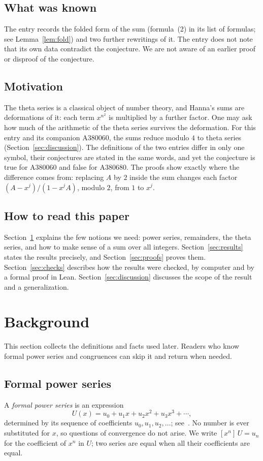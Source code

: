 \documentclass[11pt,a4paper]{article}
\theoremstyle{definition}
\theoremstyle{remark}
\newcommand{\coeff}[2]{[x^{#1}]\,#2}
\begin{document}
\subsection{What was known}
The entry records the folded form of the sum (formula~(2) in its list of formulas; see Lemma~\ref{lem:fold}) and two further
rewritings of it. The entry does not note that its own data contradict the conjecture. We are not aware of an earlier proof or disproof of the conjecture.

\subsection{Motivation}
The theta series is a classical object of number theory, and Hanna's sums are deformations of it: each term
$x^{n^2}$ is multiplied by a further factor. One may ask how much of the arithmetic of the theta series survives the
deformation. For this entry and its companion A380060, the sums reduce modulo $4$ to theta series
(Section~\ref{sec:discussion}).
The definitions of the two entries differ in only one symbol, their
conjectures are stated in the same words, and yet the conjecture is true for A380060 and false for A380680. The proofs show exactly where the
difference comes from: replacing $A$ by $2$ inside the sum changes each factor $(A-x^j)/(1-x^jA)$, modulo $2$, from $1$
to $x^j$.

\subsection{How to read this paper}
Section~\ref{sec:background} explains the few notions we need: power series, remainders, the theta series, and how to
make sense of a sum over all integers. Section~\ref{sec:results} states the results precisely, and
Section~\ref{sec:proofs} proves them. Section~\ref{sec:checks} describes how the results were
checked, by computer and by a formal proof in Lean. Section~\ref{sec:discussion} discusses the scope of the result
and a generalization.
\section{Background}\label{sec:background}
This section collects the definitions and facts used later. Readers who know formal power series and congruences can skip it and return when needed.
\subsection{Formal power series}
A \emph{formal power series} is an expression
\[
U(x)=u_0+u_1x+u_2x^2+u_3x^3+\cdots ,
\]
determined by its sequence of coefficients $u_0,u_1,u_2,\dots$; see~\cite{niven,stanley}. No number is ever
substituted for $x$, so questions of convergence do not arise. We write $\coeff{n}{U}=u_n$ for the coefficient of $x^n$ in $U$; two series are equal
when all their coefficients are equal.
\end{document}

